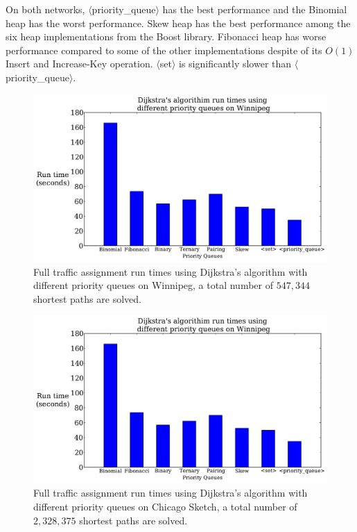 On both networks, 
$\langle$priority\_queue$\rangle$ has the best performance and the Binomial heap has the worst performance.
Skew heap has the best performance among the six heap implementations from the Boost library.
Fibonacci heap has worse performance compared to some of the other implementations despite of its $O(1)$ Insert and Increase-Key operation.
$\langle$set$\rangle$ is significantly slower than $\langle$priority\_queue$\rangle$.

\begin{figure}[!ht]
    \centering
    \includegraphics[page=1, width=\textwidth, height=.4\textheight]{img/pq_runtime}
    \caption{Full traffic assignment run times using Dijkstra's algorithm with different priority queues on Winnipeg, a total number of $547{,}344$ shortest paths are solved.}
    \label{fig:pq_runtime2}
\end{figure}
\begin{figure}[!ht]
    \centering
    \includegraphics[page=2, width=\textwidth, height=.4\textheight]{img/pq_runtime}
    \caption{Full traffic assignment run times using Dijkstra's algorithm with different priority queues on Chicago Sketch, a total number of $2{,}328{,}375$ shortest paths are solved.}
    \label{fig:pq_runtime}
\end{figure}

